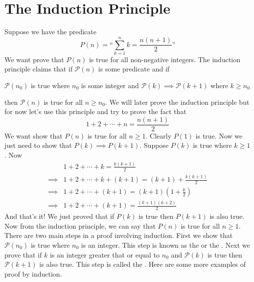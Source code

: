 \documentclass[11pt,numbers=noenddot,svgnames,dvipsnames]{scrartcl}
\begin{document}
\section{The Induction Principle}
Suppose we have the predicate 
\[
    P(n) = \text{``}\sum_{k=1}^{n} k = \frac{n(n+1)}{2} \text{''}
\]
We want prove that $P(n)$ is true for all non-negative integers. The induction principle claims that if 
$\mathcal{P}(n)$ is some predicate and if
\begin{itemize}
        \ii $\mathcal{P}(n_{0})$ is true where $n_{0}$ is some integer and 
        \ii $\mathcal{P}(k) \implies \mathcal{P}(k+1)$ where $k\geq n_{0}$
\end{itemize}
then $\mathcal{P}(n)$ is true for all $n \geq n_{0}$. We will later prove the induction principle but for now 
let's use this principle and try to prove the fact that 
\[
    1 + 2 + \cdots + n = \frac{n(n+1)}{2}
\]
We want show that $P(n)$ is true for all $n\geq 1$. Clearly $P(1)$ is true. Now we just need to show that 
$P(k) \implies P(k+1)$. Suppose $P(k)$ is true where $k \geq 1$. Now
\begin{align*}
             & 1 + 2 + \cdots + k = \frac{k(k+1)}{2} \\
    \implies & 1 + 2 + \cdots + k + (k+1) = (k+1) + \frac{k(k+1)}{2} \\
    \implies & 1 + 2 + \cdots + (k+1) = (k+1) \left(1 + \frac{k}{2}\right) \\
    \implies & 1 + 2 + \cdots + (k+1) = \frac{(k+1)(k + 2)}{2}
\end{align*}
And that's it! We just proved that if $P(k)$ is true then $P(k+1)$ is also true. Now from the induction 
principle, we can say that $P(n)$ is true for all $n \geq 1$. \\
There are two main steps in a proof involving induction. First we show that $\mathcal{P}(n_{0})$ is 
true where $n_{0}$ is an integer. This step is known as the  or the . 
Next we prove that if $k$ is an integer greater that or equal to $n_{0}$ and $\mathcal{P}(k)$ is true then 
$\mathcal{P}(k+1)$ is also true. This step is called the . Here are some more examples 
of proof by induction.
\end{document}
